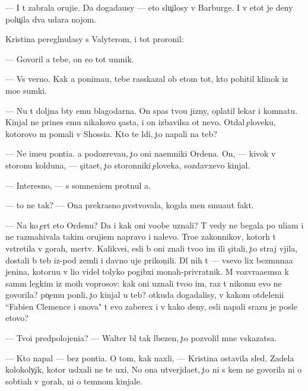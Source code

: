 \documentclass[10pt]{book}
\begin{document}
— I t{\yi} zabrala oruji{\y}e. Da{\y} dogada{\y}usy — eto slu{\c}ilosy v Barburge. I v etot je deny polu{\c}ila dva udara nojom.

Kristina peregl{\ia}nulasy s Valyterom, i tot proronil:

— Govoril {\y}a tebe, on {\y}e{\x}o tot umnik.

— Vs{\e} verno. Kak {\y}a ponima{\y}u, tebe rasskazal ob etom tot, kto pohitil klinok iz mo{\y}e{\y} sumki.

— Nu t{\yi} doljna b{\yi}ty {\y}emu blagodarna. On spas tvo{\y}u jizny, oplatil lekar{\ia} i komnatu. Kinjal ne prines {\y}emu nikakovo s{\c}ast{\y}a, i on izbavilsa ot nevo. Otdal {\c}eloveku, kotorovo m{\yi} po{\y}mali v Shossi{\y}a. Kto te l{\iu}di, {\c}to napali na teb{\ia}?

— Ne ime{\y}u pon{\ia}ti{\y}a. {\Y}a podozreva{\y}u, {\c}to oni na{\y}emniki Ordena. On, — kivok v storonu kolduna, — s{\c}ita{\y}et, {\c}to storonniki {\c}eloveka, sozdavxevo kinjal.

— Interesno, — s somneni{\y}em prot{\ia}nul {\y}a.

— {\C}to ne tak? — Ona prekrasno {\c}uvstvovala, kogda men{\ia} smu{\x}a{\y}ut fakt{\yi}.

— Na ko{\y} {\c}ert eto Ordenu? Da i kak oni voob{\x}e uznali? T{\yi} vedy ne begala po uli{\q}am i ne razmahivala takim oruji{\y}em napravo i nalevo. Tro{\y}e zakonnikov, kotor{\yi}h t{\yi} vstretila v gorah, mertv{\yi}. Kalikve{\q}i, {\y}esli b{\yi} oni znali tvo{\y}o im{\ia} ili s{\c}itali, {\c}to straj v{\yi}jila, dostali b{\yi} teb{\ia} iz-pod zemli i davno uje prikon{\c}ili. Dl{\ia} nih t{\yi} — vsevo lix bez{\yi}m{\ia}nna{\y}a jen{\x}ina, kotoru{\y}u v li{\q}o videl tolyko pogibxi{\y} monah-privratnik. M{\yi} vozvra{\x}a{\y}emsa k sam{\yi}m legkim iz mo{\y}ih voprosov: kak oni uznali tvo{\y}o im{\ia}, raz t{\yi} nikomu {\y}evo ne govorila? po{\c}emu pon{\ia}li, {\c}to kinjal u teb{\ia}? otkuda dogadalisy, v kakom otdeleni{\y}i ``Fabien Clemence i s{\yi}nov{\y}a" t{\yi} {\y}evo zaberex i v kako{\y} deny, {\y}esli napali srazu je posle etovo?

— Tvo{\y}i predpolojeni{\y}a? — Walter b{\yi}l tak l{\iu}bezen, {\c}to pozvolil mne v{\yi}skazatsa.

— Kto napal — bez pon{\ia}ti{\y}a. O tom, kak naxli, — Kristina ostavila sled{\yi}. Zadela kolokoly{\c}ik, kotor{\yi}{\y} usl{\yi}xali ne te uxi. No ona utverjda{\y}et, {\c}to ni s kem ne govorila ni o sob{\yi}ti{\y}ah v gorah, ni o temnom kinjale.
\end{document}
